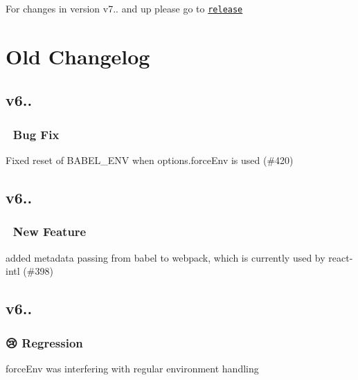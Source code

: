 For changes in version v7.. and up please go to \href{https://github.com/babel/babel-loader/releases}{\tt release}

\section*{Old Changelog}

\subsection*{v6..}

\subsubsection*{🐛 Bug Fix}


\begin{DoxyItemize}
\item Fixed reset of B\+A\+B\+E\+L\+\_\+\+E\+NV when options.\+force\+Env is used (\#420) 
\end{DoxyItemize}

\subsection*{v6..}

\subsubsection*{🚀 New Feature}


\begin{DoxyItemize}
\item added metadata passing from babel to webpack, which is currently used by react-\/intl (\#398) 
\end{DoxyItemize}

\subsection*{v6..}

\subsubsection*{😢 Regression}


\begin{DoxyItemize}
\item {\ttfamily force\+Env} was interfering with regular environment handling
\end{DoxyItemize}

